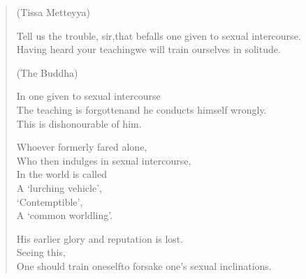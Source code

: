 
\begin{verse}

(Tissa Metteyya)

 Tell us the trouble, sir,\newline that befalls one given to sexual intercourse.\\
Having heard your teaching\newline we will train ourselves in solitude.


(The Buddha)

 In one given to sexual intercourse\\
The teaching is forgotten\newline and he conducts himself wrongly.\\
This is dishonourable of him.


 Whoever formerly fared alone,\\
Who then indulges in sexual intercourse,\\
In the world is called\\
A `lurching vehicle',\\
`Contemptible',\\
A `common worldling'.


 His earlier glory and reputation is lost.\\
Seeing this,\\
One should train oneself\newline to forsake one's sexual inclinations.



\end{verse}
